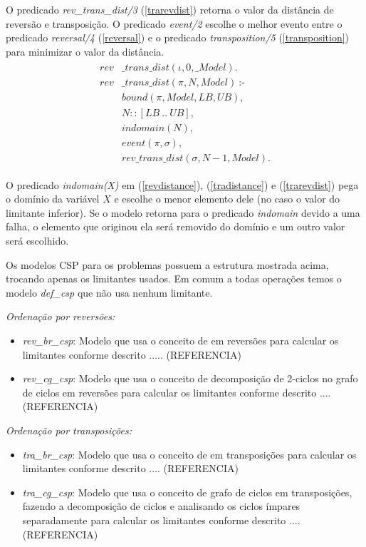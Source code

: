 O predicado \textit{rev\_trans\_dist/3} (\ref{trarevdist}) retorna o
valor da distância de reversão e transposição. O
predicado \textit{event/2} escolhe o melhor evento entre o
predicado \textit{reversal/4} (\ref{reversal}) e o
predicado \textit{transposition/5} (\ref{transposition}) para
minimizar o valor da distância.
\begin{align}
  \label{trarevdist}
  \begin{split}
  \textit{rev}&\textit{\_trans\_dist}(\iota, 0, \_Model). \\
  \textit{rev}&\textit{\_trans\_dist}(\pi, N, Model)~\text{:-} \\
  &\textit{bound}(\pi, Model, LB, UB), \\
  &N :: [LB~..~UB], \\
  &\textit{indomain}(N),  \\
  &\textit{event}(\pi, \sigma),  \\
  &\textit{rev\_trans\_dist}(\sigma, N-1, Model). 
  \end{split}
\end{align}

O predicado \textit{indomain(X)} em (\ref{revdistance}),
(\ref{tradistance}) e (\ref{trarevdist}) pega o domínio da variável
$X$ e escolhe o menor elemento dele (no caso o valor do limitante
inferior). Se o modelo retorna para o predicado \textit{indomain}
devido a uma falha, o elemento que originou ela será removido do
domínio e um outro valor será escolhido.

Os modelos CSP para os problemas possuem a estrutura mostrada acima,
trocando apenas os limitantes usados. Em comum a todas operações temos
o modelo \textit{def\_csp} que não usa nenhum limitante.

\textit{Ordenação por reversões:}
\begin{itemize}
\item{\textit{rev\_br\_csp}: 
Modelo que usa o conceito de \bkp{} em reversões para calcular os
limitantes conforme descrito ..... (REFERENCIA)}
\item{\textit{rev\_cg\_csp}:
Modelo que usa o conceito de decomposição de 2-ciclos no grafo de
ciclos em reversões para calcular os limitantes conforme descrito
.... (REFERENCIA)}
\end{itemize}

\textit{Ordenação por transposições:}
\begin{itemize}
\item{\textit{tra\_br\_csp}: 
Modelo que usa o conceito de \bkp{} em transposições para calcular os
limitantes conforme descrito .... (REFERENCIA)}
\item{\textit{tra\_cg\_csp}:
Modelo que usa o conceito de grafo de ciclos em transposições, fazendo
a decomposição de ciclos e analisando os ciclos ímpares separadamente
para calcular os limitantes conforme descrito .... (REFERENCIA)}
\end{itemize}

